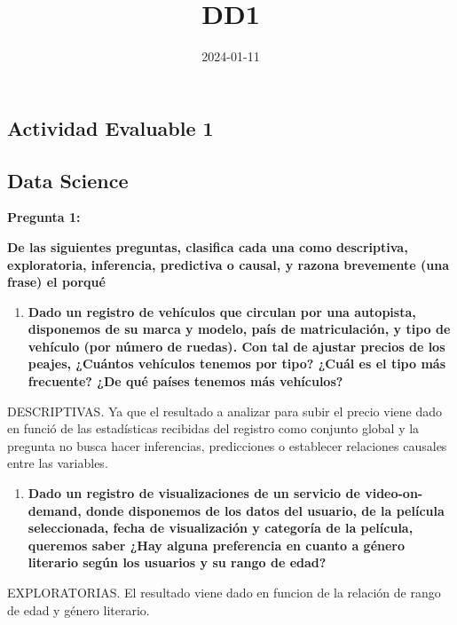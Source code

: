 \documentclass[
]{article}
\title{DD1}
\author{}
\date{\vspace{-2.5em}2024-01-11}
\providecommand{\tightlist}{%
  \setlength{\itemsep}{0pt}\setlength{\parskip}{0pt}}
\begin{document}
\maketitle

\hypertarget{actividad-evaluable-1}{%
\subsection{Actividad Evaluable 1}\label{actividad-evaluable-1}}

\hypertarget{data-science}{%
\subsection{Data Science}\label{data-science}}

\textbf{Pregunta 1:}

\textbf{De las siguientes preguntas, clasifica cada una como
descriptiva, exploratoria, inferencia, predictiva o causal, y razona
brevemente (una frase) el porqué}

\begin{enumerate}
\def\labelenumi{\arabic{enumi}.}
\tightlist
\item
  \textbf{Dado un registro de vehículos que circulan por una autopista,
  disponemos de su marca y modelo, país de matriculación, y tipo de
  vehículo (por número de ruedas). Con tal de ajustar precios de los
  peajes, ¿Cuántos vehículos tenemos por tipo? ¿Cuál es el tipo más
  frecuente? ¿De qué países tenemos más vehículos?}
\end{enumerate}

DESCRIPTIVAS. Ya que el resultado a analizar para subir el precio viene
dado en funció de las estadísticas recibidas del registro como conjunto
global y la pregunta no busca hacer inferencias, predicciones o
establecer relaciones causales entre las variables.

\begin{enumerate}
\def\labelenumi{\arabic{enumi}.}
\setcounter{enumi}{1}
\tightlist
\item
  \textbf{Dado un registro de visualizaciones de un servicio de
  video-on-demand, donde disponemos de los datos del usuario, de la
  película seleccionada, fecha de visualización y categoría de la
  película, queremos saber ¿Hay alguna preferencia en cuanto a género
  literario según los usuarios y su rango de edad?}
\end{enumerate}

EXPLORATORIAS. El resultado viene dado en funcion de la relación de
rango de edad y género literario.
\end{document}
